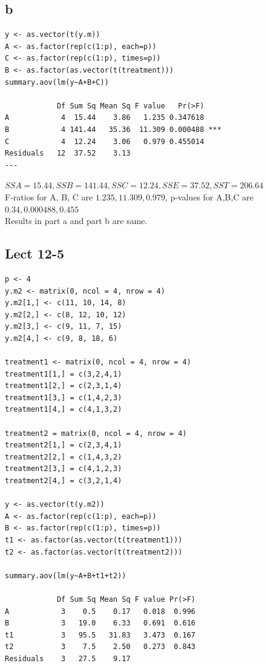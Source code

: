 \documentclass[11pt,letterpaper]{article}
\begin{document}
\subsection*{b}
\begin{verbatim}
y <- as.vector(t(y.m))
A <- as.factor(rep(c(1:p), each=p))
C <- as.factor(rep(c(1:p), times=p))
B <- as.factor(as.vector(t(treatment)))
summary.aov(lm(y~A+B+C))

            Df Sum Sq Mean Sq F value   Pr(>F)    
A            4  15.44    3.86   1.235 0.347618    
B            4 141.44   35.36  11.309 0.000488 ***
C            4  12.24    3.06   0.979 0.455014    
Residuals   12  37.52    3.13                     
---
\end{verbatim}

\noindent $SSA = 15.44, SSB = 141.44, SSC = 12.24, SSE = 37.52, SST = 206.64$ \\

\noindent F-ratios for A, B, C are $1.235, 11.309, 0.979$, p-values for A,B,C are $0.34, 0.000488, 0.455$ \\

\noindent Results in part a and part b are same. 

\subsection*{Lect 12-5}
\begin{verbatim}
p <- 4
y.m2 <- matrix(0, ncol = 4, nrow = 4)
y.m2[1,] <- c(11, 10, 14, 8)
y.m2[2,] <- c(8, 12, 10, 12)
y.m2[3,] <- c(9, 11, 7, 15)
y.m2[4,] <- c(9, 8, 18, 6)

treatment1 <- matrix(0, ncol = 4, nrow = 4)
treatment1[1,] = c(3,2,4,1)
treatment1[2,] = c(2,3,1,4)
treatment1[3,] = c(1,4,2,3)
treatment1[4,] = c(4,1,3,2)

treatment2 = matrix(0, ncol = 4, nrow = 4)
treatment2[1,] = c(2,3,4,1)
treatment2[2,] = c(1,4,3,2)
treatment2[3,] = c(4,1,2,3)
treatment2[4,] = c(3,2,1,4)

y <- as.vector(t(y.m2))
A <- as.factor(rep(c(1:p), each=p))
B <- as.factor(rep(c(1:p), times=p))
t1 <- as.factor(as.vector(t(treatment1)))
t2 <- as.factor(as.vector(t(treatment2)))

summary.aov(lm(y~A+B+t1+t2))

            Df Sum Sq Mean Sq F value Pr(>F)
A            3    0.5    0.17   0.018  0.996
B            3   19.0    6.33   0.691  0.616
t1           3   95.5   31.83   3.473  0.167
t2           3    7.5    2.50   0.273  0.843
Residuals    3   27.5    9.17           
\end{verbatim}
\end{document}
